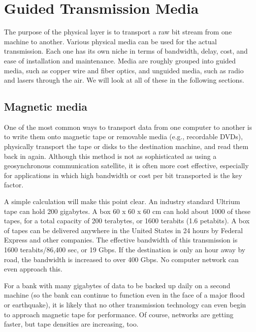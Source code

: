 \protect\hypertarget{0130661023_ch02lev1sec2.html}{}{}

\protect\hypertarget{0130661023_ch02lev1sec2.htmlux5cux23ch02lev1sec2}{}{}

\section{Guided Transmission Media}

The purpose of the physical layer is to transport a raw bit stream from
one machine to another. Various physical media can be used for the
actual transmission. Each one has its own niche in terms of bandwidth,
delay, cost, and ease of installation and maintenance. Media are roughly
grouped into guided media, such as copper wire and fiber optics, and
unguided media, such as radio and lasers through the air. We will look
at all of these in the following sections.

\protect\hypertarget{0130661023_ch02lev1sec2.htmlux5cux23ch02lev2sec4}{}{}

\subsection{Magnetic media}

One of the most common ways to transport data from one computer to
another is to write them onto magnetic tape or removable media (e.g.,
recordable DVDs), physically transport the tape or disks to the
destination machine, and read them back in again. Although this method
is not as sophisticated as using a geosynchronous communication
satellite, it is often more cost effective, especially for applications
in which high bandwidth or cost per bit transported is the key factor.

A simple calculation will make this point clear. An industry standard
Ultrium tape can hold 200 gigabytes. A box 60 x 60 x 60 cm can hold
about 1000 of these tapes, for a total capacity of 200 terabytes, or
1600 terabits (1.6 petabits). A box of tapes can be delivered anywhere
in the United States in 24 hours by Federal Express and other companies.
The effective bandwidth of this transmission is 1600 terabits/86,400
sec, or 19 Gbps. If the destination is only an hour away by road, the
bandwidth is increased to over 400 Gbps. No computer network can even
approach this.

For a bank with many gigabytes of data to be backed up daily on a second
machine (so the bank can continue to function even in the face of a
major flood or earthquake), it is likely that no other transmission
technology can even begin to approach magnetic tape for performance. Of
course, networks are getting faster, but tape densities are increasing,
too.

